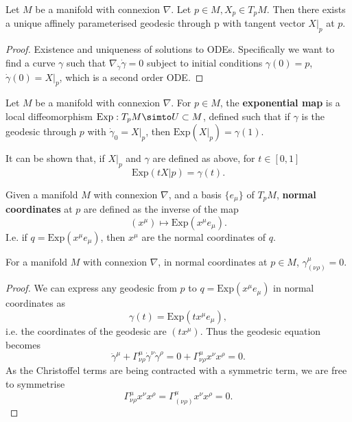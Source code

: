 \documentclass[12pt]{article}
\begin{document}
\begin{theorem}
	Let $M$ be a manifold with connexion $\nabla$. Let $p \in M, X_p \in T_pM$. Then there exists a unique affinely parameterised geodesic through p with tangent vector $X|_p$ at $p$.
\end{theorem}
\begin{proof}
	Existence and uniqueness of solutions to ODEs. Specifically we want to find a curve $\gamma$ such that $\nabla_{\dot{\gamma}}\dot{\gamma} = 0$ subject to initial conditions $\gamma(0) = p$, $\dot{\gamma}(0) = X|_p$, which is a second order ODE.
\end{proof}

\begin{definition}
	Let $M$ be a manifold with connexion $\nabla$. For $p \in M$, the \textbf{exponential map} is a local diffeomorphism $\text{Exp}: T_pM \simto U \subset M$, defined such that if $\gamma$ is the geodesic through $p$ with $\dot{\gamma}_0 = X|_p$, then $\text{Exp}(X|_p) = \gamma(1)$.
\end{definition}
\begin{remark}
	It can be shown that, if $X|_p$ and $\gamma$ are defined as above, for $t \in [0,1]$
		\begin{equation}
			\text{Exp}(tX|p) = \gamma(t).
		\end{equation}
\end{remark}

\begin{definition}
	Given a manifold $M$ with connexion $\nabla$, and a basis $\{ e_\mu \}$ of $T_pM$, \textbf{normal coordinates} at $p$ are defined as the inverse of the map
		\begin{equation}
			(x^\mu) \mapsto \text{Exp}(x^\mu e_\mu).
		\end{equation}
	I.e. if $q = \text{Exp}(x^\mu e_\mu)$, then $x^\mu$ are the normal coordinates of $q$.
\end{definition}

\begin{lemma}
	For a manifold $M$ with connexion $\nabla$, in normal coordinates at $p \in M$, $\gamma^\mu_{(\nu\rho)} = 0$.
\end{lemma}
\begin{proof}
	We can express any geodesic from $p$ to $q = \text{Exp}(x^\mu e_\mu)$ in normal coordinates as
		\begin{equation}
			\gamma(t) = \text{Exp}(t x^\mu e_\mu),
		\end{equation}
	i.e. the coordinates of the geodesic are $(tx^\mu)$. Thus the geodesic equation becomes
		\begin{equation}
			\ddot{\gamma}^\mu + \Gamma^\mu_{\nu\rho} \dot{\gamma}^\nu \dot{\gamma}^\rho = 0 + \Gamma^\mu_{\nu\rho} x^\nu x^\rho = 0.
		\end{equation}
	As the Christoffel terms are being contracted with a symmetric term, we are free to symmetrise
		\begin{equation}
			\Gamma^\mu_{\nu\rho} x^\nu x^\rho = \Gamma^\mu_{(\nu\rho)} x^\nu x^\rho = 0.
		\end{equation}
\end{proof}
\end{document}
